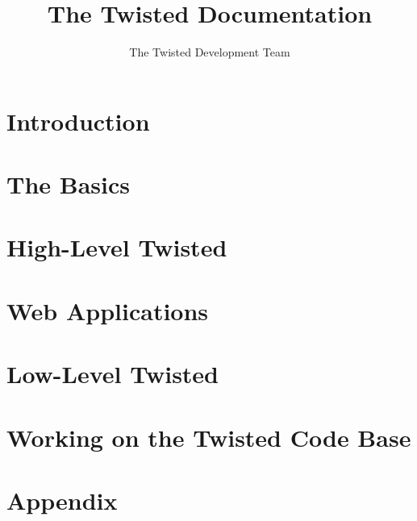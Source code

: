 \documentclass[oneside]{book}
\title{The Twisted Documentation}
\author{The Twisted Development Team}
\begin{document}
\maketitle
\tableofcontents

\chapter{Introduction}











\chapter{The Basics}









\chapter{High-Level Twisted}












\chapter{Web Applications }








\chapter{Low-Level Twisted }










\chapter{Working on the Twisted Code Base}






\chapter{Appendix}



\end{document}
